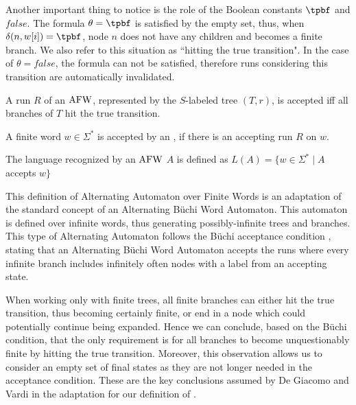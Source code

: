 Another important thing to notice is the role of the Boolean constants $\tpbf$ and $\bm{\mathit{false}}$. The formula $\theta=\tpbf$ is satisfied by the empty set, thus, when $\delta(n,w[i])=\tpbf$, node $n$ does not have any children and becomes a finite branch. We also refer to this situation as ``hitting the true transition". In the case of $\theta=\bm{\mathit{false}}$, the formula can not be satisfied, therefore runs considering this transition are automatically invalidated. 

\begin{definition}
    A run $R$ of an $\mathrm{AFW}$, represented by the $S$-labeled tree $(T,r)$, is accepted iff all branches of $T$ hit the true transition. 
\end{definition}

\begin{definition}[Acceptance]
    A finite word $w\in\Sigma^*$ is accepted by an \AFW, if there is an accepting run $R$ on $w$.
\end{definition}

\begin{definition}[Language]
    The language recognized by an $\mathrm{AFW}$ $A$ is defined as $L(A)=\{w \in \Sigma^* \mid A$ accepts $w\}$
\end{definition}

This definition of Alternating Automaton over Finite Words is an adaptation of the standard concept of an Alternating Büchi Word Automaton. This automaton is defined over infinite words, thus generating possibly-infinite trees and branches. This type of Alternating Automaton follows the Büchi acceptance condition \cite{buchi90a}, stating that an Alternating Büchi Word Automaton accepts the runs where every infinite branch includes infinitely often nodes with a label from an accepting state.


When working only with finite trees, all finite branches can either hit the true transition, thus becoming certainly finite, or end in a node which could potentially continue being expanded. Hence we can conclude, based on the Büchi condition, that the only requirement is for all branches to become unquestionably finite by hitting the true transition. Moreover, this observation allows us to consider an empty set of final states as they are not longer needed in the acceptance condition. These are the key conclusions assumed by De Giacomo and Vardi \cite{giavar15a} in the adaptation for our definition of \AFW.



